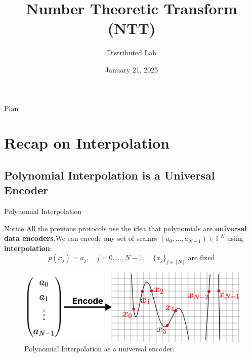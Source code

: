 \documentclass{zkdl-presentation-template}
\title[NNT. PlonK]{\textbf{Number Theoretic Transform (NTT)}}
\author{Distributed Lab}
\date{January 21, 2025}
\begin{document}

    \begin{frame}{Plan}
        \tableofcontents
    \end{frame}

    \section{Recap on Interpolation}

    \subsection{Polynomial Interpolation is a Universal Encoder}
    \begin{frame}{Polynomial Interpolation}
        \begin{block}{Notice}
            All the previous protocols use the idea that polynomials 
            are \textbf{universal data encoders}.\pause We can encode any 
            set of scalars $(a_0,\dots,a_{N-1}) \in \mathbb{F}^N$ 
            using \textbf{interpolation}:
            \begin{equation*}
                p(x_j) = a_j, \quad j = 0,\dots,N-1, \quad \text{$\{x_j\}_{j \in [N]}$ are fixed}
            \end{equation*}
        \end{block}

        \begin{figure}
            \centering
            \includegraphics[width=\textwidth]{images/lecture_13/encoding.pdf}
            \caption{Polynomial Interpolation as a universal encoder.}
        \end{figure}        
    \end{frame}
\end{document}
